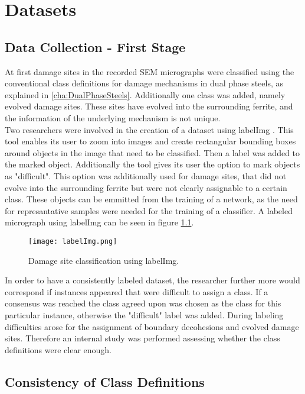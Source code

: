 \chapter{Datasets}

\section{Data Collection - First Stage}
At first damage sites in the recorded SEM micrographs were classified using the conventional class definitions for damage mechanisms in dual phase steels, as explained in \ref{cha:DualPhaseSteels}. Additionally one class was added, namely evolved damage sites. These sites have evolved into the surrounding ferrite, and the information of the underlying mechanism is not unique. \\

Two researchers were involved in the creation of a dataset using labelImg \cite{labelImg}. This tool enables its user to zoom into images and create rectangular bounding boxes around objects in the image that need to be classified. Then a label was added to the marked object. Additionally the tool gives its user the option to mark objects as "difficult". This option was additionally used for damage sites, that did not evolve into the surrounding ferrite but were not clearly assignable to a certain class. These objects can be emmitted from the training of a network, as the need for represantative samples were needed for the training of a classifier. A labeled micrograph using labelImg can be seen in figure \ref{fig:labelImg}. \\

\begin{figure}
\centering
\texttt{[image: labelImg.png]}
\caption{Damage site classification using labelImg.}
\label{fig:labelImg}
\end{figure}

In order to have a consistently labeled dataset, the researcher further more would correspond if instances appeared that were difficult to assign a class. If a consensus was reached the class agreed upon was chosen as the class for this particular instance, otherwise the "difficult" label was added. During labeling difficulties arose for the assignment of boundary decohesions and evolved damage sites. Therefore an internal study was performed assessing whether the class definitions were clear enough. 

\section{Consistency of Class Definitions}

